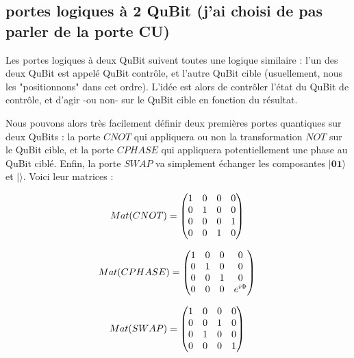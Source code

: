 \documentclass[a4paper,12pt]{report}
\newcommand{\quSt}[1]{\bm{|#1\rangle}}
\begin{document}
		\subsection{portes logiques à 2 QuBit (j'ai choisi de pas parler de la porte CU)}

\par{
	Les portes logiques à deux QuBit suivent toutes une logique similaire : l'un des deux QuBit est appelé QuBit contrôle, et l'autre QuBit cible (usuellement, nous les "positionnons" dans cet ordre). L'idée est alors de contrôler l'état du QuBit de contrôle, et d'agir -ou non- sur le QuBit cible en fonction du résultat.
}

\vspace{1\baselineskip}

\par{
	Nous pouvons alors très facilement définir deux premières portes quantiques sur deux QuBits : la porte $CNOT$ qui appliquera ou non la transformation $NOT$ sur le QuBit cible, et la porte $CPHASE$ qui appliquera potentiellement une phase au QuBit ciblé. Enfin, la porte $SWAP$ va simplement échanger les composantes $\quSt{01}$ et $\quSt{}$. Voici leur matrices :
}

\begin{equation}
	 Mat(CNOT) = \left( \begin{matrix} 1 & 0 & 0 & 0 \\ 0 & 1 & 0 & 0 \\ 0 & 0 & 0 & 1 \\ 0 & 0 & 1 & 0 \\ \end{matrix} \right ) \\
\end{equation}

\vspace{1\baselineskip}

\begin{equation}
	 Mat(CPHASE) = \left( \begin{matrix} 1 & 0 & 0 & 0 \\ 0 & 1 & 0 & 0 \\ 0 & 0 & 1 & 0 \\ 0 & 0 & 0 & e^{i\Phi} \\ \end{matrix} \right ) \\
\end{equation}

\vspace{1\baselineskip}

\begin{equation}
	 Mat(SWAP) = \left( \begin{matrix} 1 & 0 & 0 & 0 \\ 0 & 0 & 1 & 0 \\ 0 & 1 & 0 & 0 \\ 0 & 0 & 0 & 1 \\ \end{matrix} \right ) \\
\end{equation}
\end{document}
